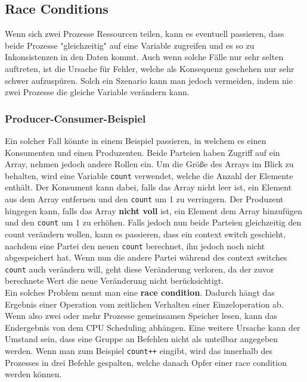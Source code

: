 \documentclass{article}
\begin{document}
	 \subsection{Race Conditions}
	 Wenn sich zwei Prozesse Ressourcen teilen, kann es eventuell passieren, dass beide Prozesse "gleichzeitig" auf eine Variable zugreifen und es so zu Inkonsistenzen in den Daten kommt. Auch wenn solche Fälle nur sehr selten auftreten, ist die Ursache für Fehler, welche als Konsequenz geschehen nur sehr schwer aufzuspüren. Solch ein Szenario kann man jedoch vermeiden, indem nie zwei Prozesse die gleiche Variable verändern kann. \\
	 \subsubsection{Producer-Consumer-Beispiel}
	 Ein solcher Fall könnte in einem Beispiel passieren, in welchem es einen Konsumenten und einen Produzenten. Beide Parteien haben Zugriff auf ein Array, nehmen jedoch andere Rollen ein. Um die Größe des Arrays im Blick zu behalten, wird eine Variable \verb|count|  verwendet, welche die Anzahl der Elemente enthält. Der Konsument kann dabei, falls das Array nicht leer ist, ein Element aus dem Array entfernen und den \verb|count| um 1 zu verringern. Der Produzent hingegen kann, falls das Array \textbf{nicht voll} ist, ein Element dem Array hinzufügen und den \verb|count| um 1 zu erhöhen. Falls jedoch nun beide Parteien gleichzeitig den count verändern wollen, kann es passieren, dass ein context switch geschieht, nachdem eine Partei den neuen \verb|count| berechnet, ihn jedoch noch nicht abgespeichert hat. Wenn nun die andere Partei während des context switches \verb|count| auch verändern will, geht diese Veränderung verloren, da der zuvor berechnete Wert die neue Veränderung nicht berücksichtigt. \\
	 Ein solches Problem nennt man eine \textbf{race condition}. Dadurch hängt das Ergebnis einer Operation vom zeitlichen Verhalten einer Einzeloperation ab. Wenn also zwei oder mehr Prozesse gemeinsamen Speicher lesen, kann das Endergebnis von dem CPU Scheduling abhängen. Eine weitere Ursache kann der Umstand sein, dass eine Gruppe an Befehlen nicht als unteilbar angegeben werden. Wenn man zum Beispiel \verb|count++| eingibt, wird das innerhalb des Prozesses in drei Befehle gespalten, welche danach Opfer einer race condition werden können. 
\end{document}
